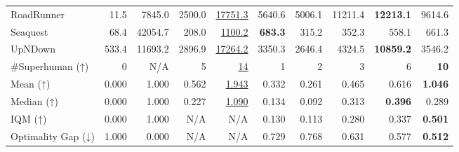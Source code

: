 \begin{table}[t]
\begin{center}
\begin{small}
{\begin{tabular}{lrr rr rrrrr}
RoadRunner           &  11.5      &  7845.0    &  2500.0    &  \underline{17751.3}   &  5640.6                        &  5006.1                        &  11211.4                      &  \textbf{12213.1}              &  9614.6                        \\
Seaquest             &  68.4      &  42054.7   &  208.0     &  \underline{1100.2}    &  \textbf{683.3}                &  315.2                         &  352.3                        &  558.1                         &  661.3                         \\
UpNDown              &  533.4     &  11693.2   &  2896.9    &  \underline{17264.2}   &  3350.3                        &  2646.4                        &  4324.5                       &  \textbf{10859.2}              &  3546.2                        \\
\midrule
\#Superhuman (↑)     &  0         &  N/A       &  5         &  \underline{14}        &  1                             &  2                             &  3                            &  6                             &  \textbf{10}                   \\
Mean (↑)             &  0.000     &  1.000     &  0.562     &  \underline{1.943}     &  0.332                         &  0.261                         &  0.465                        &  0.616                         &  \textbf{1.046}                \\
Median (↑)           &  0.000     &  1.000     &  0.227     &  \underline{1.090}     &  0.134                         &  0.092                         &  0.313                        &  \textbf{0.396}                &  0.289                         \\
IQM (↑)              &  0.000     &  1.000     &  N/A       &  N/A                   &  0.130                         &  0.113                         &  0.280                        &  0.337                         &  \textbf{0.501}                \\
Optimality Gap (↓)   &  1.000     &  0.000     &  N/A       &  N/A                   &  0.729                         &  0.768                         &  0.631                        &  0.577                         &  \textbf{0.512}                \\
\bottomrule
\end{tabular}
 }
\end{small}
\end{center}
\vspace{-0.02\linewidth}
\end{table}